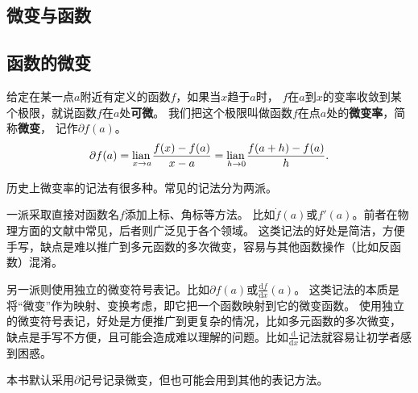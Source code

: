 \documentclass[12pt,UTF8]{ctexbook}
\begin{document}
\begin{appendix}




\chapter{微变与函数}

\section{函数的微变}

\begin{df}\label{df:b-1-0}
给定在某一点$a$附近有定义的函数$f$，如果当$x$趋于$a$时，
$f$在$a$到$x$的变率收敛到某个极限，就说函数$f$在$a$处\textbf{可微}。
我们把这个极限叫做函数$f$在点$a$处的\textbf{微变率}，简称\textbf{微变}，
记作$\partial f(a)$。
$$ \partial f(a) = \underset{x\to a}{\operatorname{lian}\,} \frac{f(x) - f(a)}{x - a} = \underset{h\to 0}{\operatorname{lian}\,} \frac{f(a + h) - f(a)}{h}.$$

历史上微变率的记法有很多种。常见的记法分为两派。

一派采取直接对函数名$f$添加上标、角标等方法。
比如$\dot{f}(a)$或$f'(a)$。前者在物理方面的文献中常见，后者则广泛见于各个领域。
这类记法的好处是简洁，方便手写，缺点是难以推广到多元函数的多次微变，容易与其他函数操作（比如反函数）混淆。

另一派则使用独立的微变符号表记。比如$\partial f(a)$或$\frac{\mathrm{d}f}{\mathrm{d}x}(a)$。
这类记法的本质是将“微变”作为映射、变换考虑，即它把一个函数映射到它的微变函数。
使用独立的微变符号表记，好处是方便推广到更复杂的情况，比如多元函数的多次微变，
缺点是手写不方便，且可能会造成难以理解的问题。比如$\frac{\mathrm{d}}{\mathrm{d}x}$记法就容易让初学者感到困惑。

本书默认采用$\partial$记号记录微变，但也可能会用到其他的表记方法。
\end{df}


\end{appendix}
\end{document}
